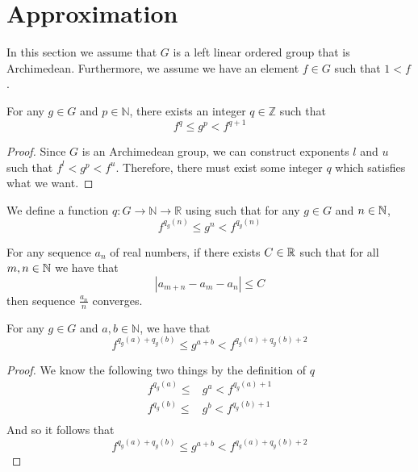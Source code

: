 \section{Approximation}
In this section we assume that $G$ is a left linear ordered group
that is Archimedean. Furthermore, we assume we have an element $f\in G$
such that $1 < f$.
\begin{theorem}\label{approximate}
    \leanok
    For any $g \in G$ and $p \in \mathbb{N}$,
    there exists an integer $q \in \mathbb{Z}$
    such that
    \[
        f^q \le g^p < f^{q+1}
    \]
\end{theorem}
\begin{proof}\leanok
Since $G$ is an Archimedean group, we can construct exponents $l$ and $u$
such that $f^l < g^p < f^u$. Therefore, there must exist some integer $q$
which satisfies what we want.
\end{proof}

\begin{definition}\label{def:q}
    \leanok{}
    We define a function $q \colon G \to \mathbb{N} \to \mathbb{R}$
    using  such that for any $g\in G$ and $n \in \mathbb{N}$,
    \[
        f^{q_g(n)} \le g^n < f^{q_g(n)}
    \]
\end{definition}

\begin{theorem}\label{sequence_convergence}
    \leanok
    For any sequence $a_n$ of real numbers,
    if there exists $C \in \mathbb{R}$ such that for all $m,n\in \mathbb{N}$
    we have that
    \[
        |a_{m+n} - a_m - a_n| \le C
    \]
    then sequence $\frac{a_n}{n}$ converges.
\end{theorem}

\begin{theorem}\label{q_exp_add}
    \leanok{}
    For any $g \in G$ and $a,b \in \mathbb{N}$, we have that
    \[
        f^{q_g(a) + q_g(b)} \le g^{a+b} < f^{q_g(a) + q_g(b) + 2}
    \]
\end{theorem}
\begin{proof}\leanok
We know the following two things by the definition of $q$
\begin{align*}
f^{q_g(a)}\le &g^a < f^{q_g(a)+1}\\
f^{q_g(b)}\le &g^b < f^{q_g(b)+1}\\
\end{align*}
And so it follows that
\[
f^{q_g(a)+q_g(b)}\le g^{a+b} < f^{q_g(a)+q_g(b) + 2}
\]
\end{proof}


